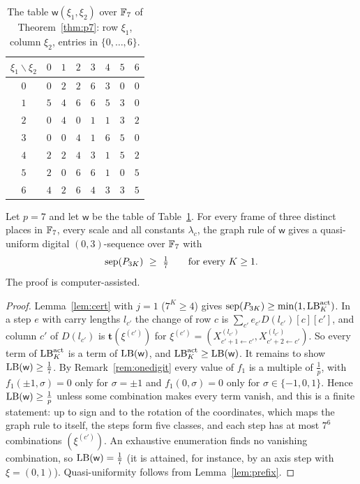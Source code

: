 \begin{table}[t]
\centering
\small
\caption{The table $\mathsf w(\xi_1,\xi_2)$ over $\mathbb{F}_7$ of Theorem~\ref{thm:p7}: row $\xi_1$, column $\xi_2$, entries in $\{0,\dots,6\}$.}
\label{tab:p7}
\begin{tabular}{@{}c|ccccccc@{}}
$\xi_1\backslash\xi_2$ & $0$ & $1$ & $2$ & $3$ & $4$ & $5$ & $6$\\
\hline
$0$ & $0$ & $2$ & $2$ & $6$ & $3$ & $0$ & $0$\\
$1$ & $5$ & $4$ & $6$ & $6$ & $5$ & $3$ & $0$\\
$2$ & $0$ & $4$ & $0$ & $1$ & $1$ & $3$ & $2$\\
$3$ & $0$ & $0$ & $4$ & $1$ & $6$ & $5$ & $0$\\
$4$ & $2$ & $2$ & $4$ & $3$ & $1$ & $5$ & $2$\\
$5$ & $2$ & $0$ & $6$ & $6$ & $1$ & $0$ & $5$\\
$6$ & $4$ & $2$ & $6$ & $4$ & $3$ & $3$ & $5$
\end{tabular}
\end{table}

\begin{theorem}\label{thm:p7}
Let $p=7$ and let $\mathsf w$ be the table of Table~\ref{tab:p7}. For every frame of three distinct places in $\mathbb{F}_7$, every scale and all constants $\lambda_c$, the graph rule of $\mathsf w$ gives a quasi-uniform digital $(0,3)$-sequence over $\mathbb{F}_7$ with
\[
\operatorname{sep}(P_{3K})\ \ge\ \tfrac17\qquad\text{for every }K\ge1 .
\]
The proof is computer-assisted.
\end{theorem}

\begin{proof}
Lemma~\ref{lem:cert} with $j=1$ ($7^K\ge4$) gives $\operatorname{sep}(P_{3K})\ge\min(1,\mathrm{LB}^{\mathrm{act}}_K)$. In a step $e$ with carry lengths $l_{c'}$ the change of row $c$ is $\sum_{c'}e_{c'}D(l_{c'})[c][c']$, and column $c'$ of $D(l_{c'})$ is $\mathbf t(\xi^{(c')})$ for $\xi^{(c')}=(X^{(l_{c'})}_{c'+1\leftarrow c'},X^{(l_{c'})}_{c'+2\leftarrow c'})$. So every term of $\mathrm{LB}^{\mathrm{act}}_K$ is a term of $\mathrm{LB}(\mathsf w)$, and $\mathrm{LB}^{\mathrm{act}}_K\ge\mathrm{LB}(\mathsf w)$. It remains to show $\mathrm{LB}(\mathsf w)\ge\frac17$. By Remark~\ref{rem:onedigit} every value of $f_1$ is a multiple of $\frac1p$, with $f_1(\pm1,\sigma)=0$ only for $\sigma=\pm1$ and $f_1(0,\sigma)=0$ only for $\sigma\in\{-1,0,1\}$. Hence $\mathrm{LB}(\mathsf w)\ge\frac1p$ unless some combination makes every term vanish, and this is a finite statement: up to sign and to the rotation of the coordinates, which maps the graph rule to itself, the steps form five classes, and each step has at most $7^6$ combinations $(\xi^{(c')})$. An exhaustive enumeration finds no vanishing combination, so $\mathrm{LB}(\mathsf w)=\frac17$ (it is attained, for instance, by an axis step with $\xi=(0,1)$). Quasi-uniformity follows from Lemma~\ref{lem:prefix}.
\end{proof}

